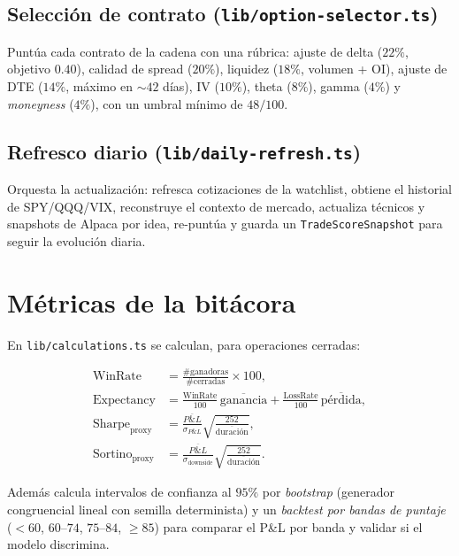 \documentclass[11pt,letterpaper]{article}
\begin{document}
\subsection{Selección de contrato (\texttt{lib/option-selector.ts})}
Puntúa cada contrato de la cadena con una rúbrica: ajuste de delta ($22\%$,
objetivo $0.40$), calidad de spread ($20\%$), liquidez ($18\%$, volumen + OI),
ajuste de DTE ($14\%$, máximo en $\sim 42$ días), IV ($10\%$), theta ($8\%$),
gamma ($4\%$) y \emph{moneyness} ($4\%$), con un umbral mínimo de $48/100$.

\subsection{Refresco diario (\texttt{lib/daily-refresh.ts})}
Orquesta la actualización: refresca cotizaciones de la watchlist, obtiene el
historial de SPY/QQQ/VIX, reconstruye el contexto de mercado, actualiza
técnicos y snapshots de Alpaca por idea, re-puntúa y guarda un
\texttt{TradeScoreSnapshot} para seguir la evolución diaria.

\section{Métricas de la bitácora}

En \texttt{lib/calculations.ts} se calculan, para operaciones cerradas:

\begin{align}
\text{WinRate} &= \frac{\#\text{ganadoras}}{\#\text{cerradas}}\times 100, \\
\text{Expectancy} &= \tfrac{\text{WinRate}}{100}\,\overline{\text{ganancia}} + \tfrac{\text{LossRate}}{100}\,\overline{\text{pérdida}}, \\
\text{Sharpe}_{\text{proxy}} &= \frac{\overline{P\&L}}{\sigma_{P\&L}}\sqrt{\frac{252}{\overline{\text{duración}}}}, \\
\text{Sortino}_{\text{proxy}} &= \frac{\overline{P\&L}}{\sigma_{\text{downside}}}\sqrt{\frac{252}{\overline{\text{duración}}}}.
\end{align}

Además calcula intervalos de confianza al $95\%$ por \emph{bootstrap} (generador
congruencial lineal con semilla determinista) y un \emph{backtest por bandas de
puntaje} ($<60$, $60$--$74$, $75$--$84$, $\ge 85$) para comparar el P\&L por
banda y validar si el modelo discrimina.
\end{document}

